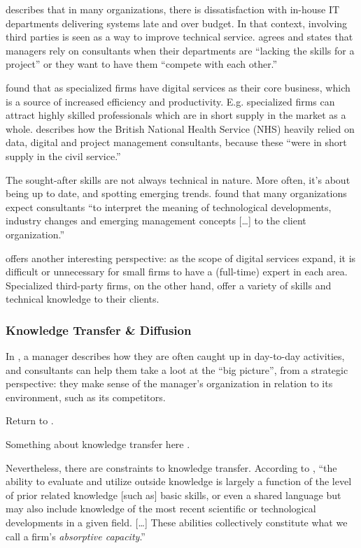 \documentclass[12pt]{article}
\begin{document}
\citet[12]{lacity1994} describes that in many organizations, there is
dissatisfaction with in-house IT departments delivering systems late and
over budget. In that context, involving third parties is seen as a way
to improve technical service. \citet[233]{sturdy1998} agrees and states
that managers rely on consultants when their departments are ``lacking
the skills for a project'' or they want to have them ``compete with each
other.''

\citet[52]{aubert1996} found that as specialized firms have digital
services as their core business, which is a source of increased
efficiency and productivity. E.g. specialized firms can attract highly
skilled professionals which are in short supply in the market as a
whole. \citet[28]{mazzucato2023} describes how the British National
Health Service (NHS) heavily relied on data, digital and project
management consultants, because these ``were in short supply in the
civil service.''

The sought-after skills are not always technical in nature. More often,
it's about being up to date, and spotting emerging trends.
\citet[53]{werr2002} found that many organizations expect consultants
``to interpret the meaning of technological developments, industry
changes and emerging management concepts {[}\ldots{]} to the client
organization.''

\citet[452]{ketler1993} offers another interesting perspective: as the
scope of digital services expand, it is difficult or unnecessary for
small firms to have a (full-time) expert in each area. Specialized
third-party firms, on the other hand, offer a variety of skills and
technical knowledge to their clients.

\subsubsection{Knowledge Transfer \&
Diffusion}\label{knowledge-transfer-diffusion}

In \citet[53]{werr2002}, a manager describes how they are often caught
up in day-to-day activities, and consultants can help them take a loot
at the ``big picture'', from a strategic perspective: they make sense of
the manager's organization in relation to its environment, such as its
competitors.

Return to \citet{turner1982}.

Something about knowledge transfer here \citep{sturdy2009}.

Nevertheless, there are constraints to knowledge transfer. According to
\citet[128-129]{cohen1990}, ``the ability to evaluate and utilize
outside knowledge is largely a function of the level of prior related
knowledge {[}such as{]} basic skills, or even a shared language but may
also include knowledge of the most recent scientific or technological
developments in a given field. {[}\ldots{]} These abilities collectively
constitute what we call a firm's \emph{absorptive capacity}.''
\end{document}
